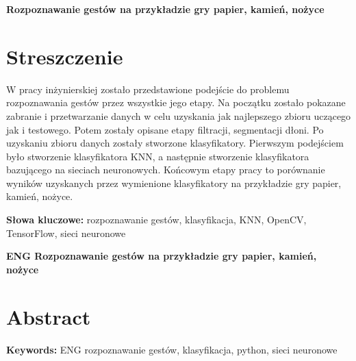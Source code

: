 \newpage
\begin{center}
\large \bf
Rozpoznawanie gestów na przykładzie gry papier, kamień, nożyce
\end{center}

\section*{Streszczenie}
W pracy inżynierskiej zostało przedstawione podejście do problemu rozpoznawania gestów przez wszystkie jego etapy. Na początku zostało pokazane zabranie i przetwarzanie danych w celu uzyskania jak najlepszego zbioru uczącego jak i testowego. Potem zostały opisane etapy filtracji, segmentacji dłoni. Po uzyskaniu zbioru danych zostały stworzone klasyfikatory. Pierwszym podejściem było stworzenie klasyfikatora KNN, a następnie stworzenie klasyfikatora bazującego na sieciach neuronowych. Końcowym etapy pracy to porównanie wyników uzyskanych przez wymienione klasyfikatory na przykładzie gry papier, kamień, nożyce.

\bigskip
{\noindent\bf Słowa kluczowe:} rozpoznawanie gestów, klasyfikacja, KNN, OpenCV, TensorFlow, sieci neuronowe

\vskip 2cm


\begin{center}
\large \bf
ENG Rozpoznawanie gestów na przykładzie gry papier, kamień, nożyce
\end{center}

\section*{Abstract}

\bigskip
{\noindent\bf Keywords:} ENG rozpoznawanie gestów, klasyfikacja, python, sieci neuronowe

\vfill